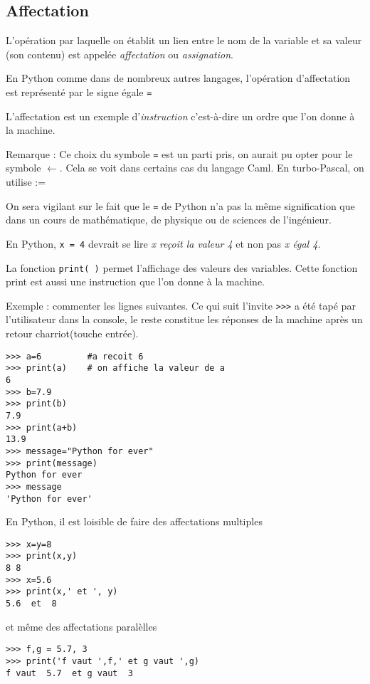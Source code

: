 \subsection{Affectation}
\begin{defi}[Affectation] L'opération par laquelle on établit un lien entre le nom de la variable et sa valeur (son contenu) est appelée \emph{affectation } ou {\it assignation}.
\end{defi}
En Python comme dans de nombreux autres langages, l'opération d'affectation est représenté par le signe égale \lstinline?=?\par
L'affectation est un exemple d'\emph{instruction} c'est-à-dire un ordre que l'on donne à la machine.\par
Remarque : Ce choix du symbole \lstinline?=? est un parti pris, on aurait pu opter pour le symbole $\leftarrow$. Cela se voit dans certains cas du langage Caml. En turbo-Pascal, on utilise :=\par
On sera vigilant sur le fait que le \lstinline?=? de Python n'a pas la même signification que dans un cours de mathématique, de physique ou de sciences de l'ingénieur.\par
En Python, \lstinline?x = 4? devrait se lire \emph{x reçoit la valeur 4} et non pas \emph{x égal 4}.\par
La fonction \lstinline?print( )? permet l'affichage des valeurs des variables. Cette fonction print est aussi une instruction que l'on donne à la machine.\par
Exemple : commenter les lignes suivantes. Ce qui suit l'invite \lstinline?>>>? a été tapé par l'utilisateur dans la console, le reste constitue les réponses de la machine après un \og retour charriot\fg (touche entrée). 
\begin{lstlisting}
>>> a=6         #a recoit 6
>>> print(a)    # on affiche la valeur de a
6
>>> b=7.9
>>> print(b)
7.9
>>> print(a+b)
13.9
>>> message="Python for ever"
>>> print(message)
Python for ever
>>> message
'Python for ever'
\end{lstlisting}
En Python, il est loisible de faire des affectations multiples
\begin{lstlisting}
>>> x=y=8
>>> print(x,y)
8 8
>>> x=5.6
>>> print(x,' et ', y)
5.6  et  8
\end{lstlisting}
 et même des affectations paralèlles
 \begin{lstlisting}
>>> f,g = 5.7, 3
>>> print('f vaut ',f,' et g vaut ',g)
f vaut  5.7  et g vaut  3
\end{lstlisting}
